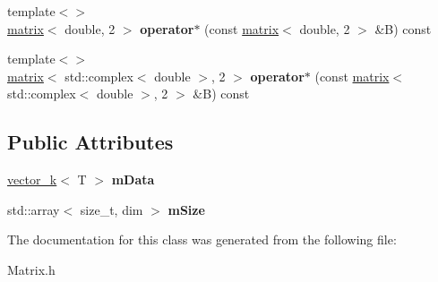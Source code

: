 \begin{DoxyCompactItemize}
\item 
\hypertarget{classkeycpp_1_1matrix_a37ff7d47a6219cf17fb4ebde48f8c7b2}{{\footnotesize template$<$$>$ }\\\hyperlink{classkeycpp_1_1matrix}{matrix}$<$ double, 2 $>$ {\bfseries operator$\ast$} (const \hyperlink{classkeycpp_1_1matrix}{matrix}$<$ double, 2 $>$ \&B) const}\label{classkeycpp_1_1matrix_a37ff7d47a6219cf17fb4ebde48f8c7b2}

\item 
\hypertarget{classkeycpp_1_1matrix_af5588cdcb9eef1da2fe80623204c5199}{{\footnotesize template$<$$>$ }\\\hyperlink{classkeycpp_1_1matrix}{matrix}$<$ std\-::complex$<$ double $>$, 2 $>$ {\bfseries operator$\ast$} (const \hyperlink{classkeycpp_1_1matrix}{matrix}$<$ std\-::complex$<$ double $>$, 2 $>$ \&B) const}\label{classkeycpp_1_1matrix_af5588cdcb9eef1da2fe80623204c5199}

\end{DoxyCompactItemize}
\subsection*{Public Attributes}
\begin{DoxyCompactItemize}
\item 
\hypertarget{classkeycpp_1_1matrix_ab9f011ec2b99ecddf781a89cf780a060}{\hyperlink{classkeycpp_1_1vector__k}{vector\-\_\-k}$<$ T $>$ {\bfseries m\-Data}}\label{classkeycpp_1_1matrix_ab9f011ec2b99ecddf781a89cf780a060}

\item 
\hypertarget{classkeycpp_1_1matrix_afcebe6fce26a54bce1a2ae376501c77e}{std\-::array$<$ size\-\_\-t, dim $>$ {\bfseries m\-Size}}\label{classkeycpp_1_1matrix_afcebe6fce26a54bce1a2ae376501c77e}

\end{DoxyCompactItemize}


The documentation for this class was generated from the following file\-:\begin{DoxyCompactItemize}
\item 
Matrix.\-h\end{DoxyCompactItemize}
